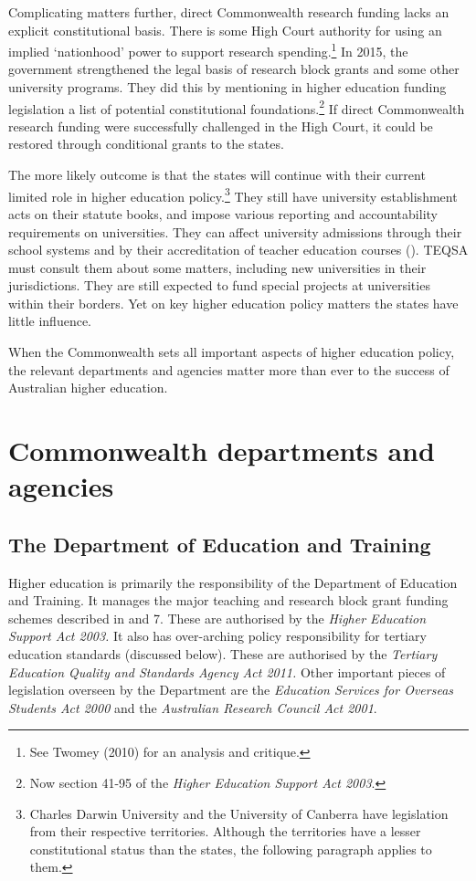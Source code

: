 \documentclass{grattan}
\begin{document}
Complicating matters further, direct Commonwealth research funding lacks an explicit constitutional basis. There is some High Court authority for using an implied `nationhood' power to support research spending.\footnote{See Twomey (2010) for an analysis and critique.} In 2015, the government strengthened the legal basis of research block grants and some other university programs. They did this by mentioning in higher education funding legislation a list of potential constitutional foundations.\footnote{Now section 41-95 of the \emph{Higher Education Support Act 2003}.} If direct Commonwealth research funding were successfully challenged in the High Court, it could be restored through conditional grants to the states.

The more likely outcome is that the states will continue with their current limited role in higher education policy.\footnote{Charles Darwin University and the University of Canberra have legislation from their respective territories. Although the territories have a lesser constitutional status than the states, the following paragraph applies to them.} They still have university establishment acts on their statute books, and impose various reporting and accountability requirements on universities. They can affect university admissions through their school systems and by their accreditation of teacher education courses (). TEQSA must consult them about some matters, including new universities in their jurisdictions. They are still expected to fund special projects at universities within their borders. Yet on key higher education policy matters the states have little influence.

When the Commonwealth sets all important aspects of higher education policy, the relevant departments and agencies matter more than ever to the success of Australian higher education.

%
\section{Commonwealth departments and agencies}\label{sec:commonwealth-departments-and-agencies}

%
\subsection{The Department of Education and Training}\label{subsec:the-department-of-education-and-training}

Higher education is primarily the responsibility of the Department of Education and Training. It manages the major teaching and research block grant funding schemes described in  and 7. These are authorised by the \emph{Higher Education Support Act 2003.} It also has over-arching policy responsibility for tertiary education standards (discussed below). These are authorised by the \emph{Tertiary Education Quality and Standards Agency Act 2011.} Other important pieces of legislation overseen by the Department are the \emph{Education Services for Overseas Students Act 2000} and the \emph{Australian Research Council Act 2001}.
\end{document}

